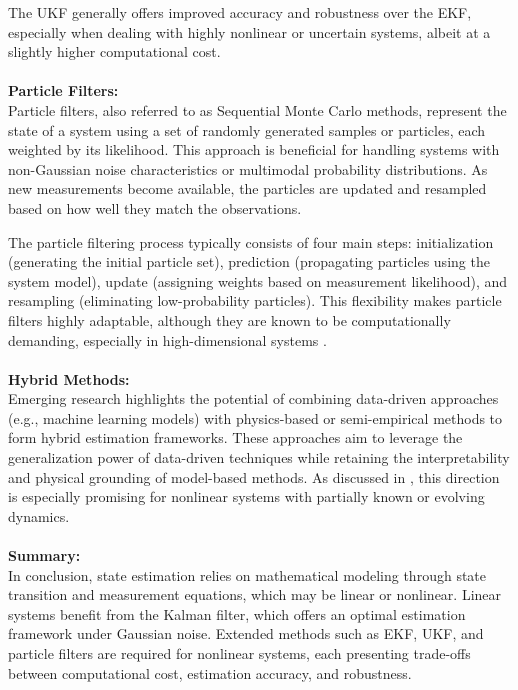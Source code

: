 The UKF generally offers improved accuracy and robustness over the EKF, especially when dealing with highly nonlinear or uncertain systems, albeit at a slightly higher computational cost.
\\
\\
\textbf{Particle Filters:} \\
Particle filters, also referred to as Sequential Monte Carlo methods, represent the state of a system using a set of randomly generated samples or particles, each weighted by its likelihood. This approach is beneficial for handling systems with non-Gaussian noise characteristics or multimodal probability distributions. As new measurements become available, the particles are updated and resampled based on how well they match the observations.

The particle filtering process typically consists of four main steps: initialization (generating the initial particle set), prediction (propagating particles using the system model), update (assigning weights based on measurement likelihood), and resampling (eliminating low-probability particles). This flexibility makes particle filters highly adaptable, although they are known to be computationally demanding, especially in high-dimensional systems \cite{PATWARDHAN2012933,10.1007/978-981-33-6977-1_12}.
\\
\\
\textbf{Hybrid Methods:} \\
Emerging research highlights the potential of combining data-driven approaches (e.g., machine learning models) with physics-based or semi-empirical methods to form hybrid estimation frameworks. These approaches aim to leverage the generalization power of data-driven techniques while retaining the interpretability and physical grounding of model-based methods. As discussed in \cite{s21062085}, this direction is especially promising for nonlinear systems with partially known or evolving dynamics.
\\
\\
\textbf{Summary:} \\
In conclusion, state estimation relies on mathematical modeling through state transition and measurement equations, which may be linear or nonlinear. Linear systems benefit from the Kalman filter, which offers an optimal estimation framework under Gaussian noise. Extended methods such as EKF, UKF, and particle filters are required for nonlinear systems, each presenting trade-offs between computational cost, estimation accuracy, and robustness.

